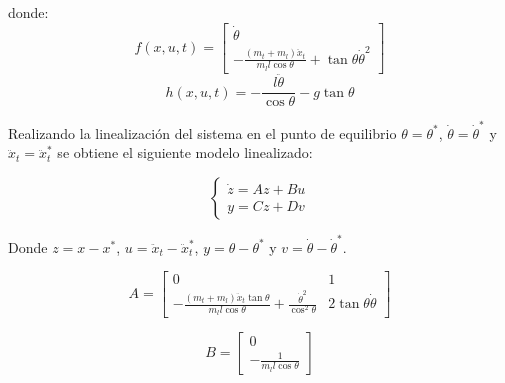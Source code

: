 \documentclass{article}
\begin{document}
            donde:
            \begin{equation}
                f(x,u,t) = \begin{bmatrix}
                    \dot{\theta} \\
                    - \frac{(m_t+m_l)\ddot{x}_t}{m_l l \cos{\theta}} + \tan{\theta} \dot{\theta}^2
                \end{bmatrix}
            \end{equation}
            \begin{equation}
                h(x,u,t) = -\frac{l \ddot{\theta}}{\cos{\theta}}  - g \tan{\theta}
            \end{equation}

            Realizando la linealización del sistema en el punto de equilibrio \(\theta = \theta^*\), \(\dot{\theta} = \dot{\theta}^*\) y \(\ddot{x}_t = \ddot{x}_t^*\) se obtiene el siguiente modelo linealizado:

            \begin{equation}
                \begin{cases}
                    \dot{z} = Az + Bu \\
                    y = Cz + Dv
                \end{cases}
            \end{equation}

            Donde \(z = x - x^*\), \(u = \ddot{x}_t - \ddot{x}_t^*\), \(y = \theta - \theta^*\) y \(v = \dot{\theta} - \dot{\theta}^*\).

            \begin{equation}
                A = \begin{bmatrix}
                    0 & 1 \\
                    -\frac{(m_t+m_l)\ddot{x}_t\tan{\theta}}{m_l l \cos{\theta}} + \frac{\dot{\theta}^2}{\cos^2{\theta}} & 2 \tan{\theta} \dot{\theta}
                \end{bmatrix}
            \end{equation}

            \begin{equation}
                B = \begin{bmatrix}
                    0 \\
                     -\frac{1}{m_l l \cos{\theta}}
                \end{bmatrix}
            \end{equation}
\end{document}

